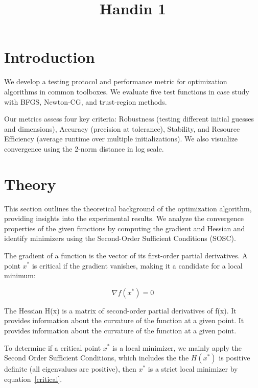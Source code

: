 \documentclass[12pt]{article}
\title{Handin 1}
\begin{document}
\maketitle

\section{Introduction}

We develop a testing protocol and performance metric for optimization algorithms in common toolboxes. We evaluate five test functions in case study with BFGS, Newton-CG, and trust-region methods.

Our metrics assess four key criteria: Robustness (testing different initial guesses and dimensions), Accuracy (precision at tolerance), Stability, and Resource Efficiency (average runtime over multiple initializations). We also visualize convergence using the 2-norm distance in log scale.


\section{Theory}

This section outlines the theoretical background of the optimization algorithm, providing insights into the experimental results. We analyze the convergence properties of the given functions by computing the gradient and Hessian and identify minimizers using the Second-Order Sufficient Conditions (SOSC).

The gradient of a function is the vector of its first-order partial derivatives. A point $x^*$ is critical if the gradient vanishes, making it a candidate for a local minimum:

\begin{equation}
\nabla f(x^*) = 0
\label{critical}
\end{equation}

The Hessian H(x) is a matrix of second-order partial derivatives of f(x). It provides information about the curvature of the function at a given point. It provides information about the curvature of the function at a given point.

To determine if a critical point $x^*$ is a local minimizer, we mainly apply the Second Order Sufficient Conditions, which includes the the $H(x^*)$ is positive definite (all eigenvalues are positive), then $x^*$ is a strict local minimizer by equation~\ref{critical}.
\end{document}
